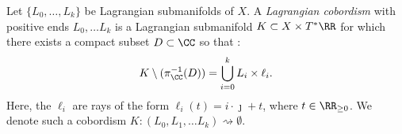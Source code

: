 
Let $\{L_0, \ldots, L_k\}$ be Lagrangian submanifolds of $X$. 
A \emph{Lagrangian cobordism} with positive ends $L_0, \ldots L_k$ is a Lagrangian submanifold $K\subset X\times T^*\RR$ for which there exists a compact subset $D\subset \CC$ so that : 
        \[K\setminus( \pi_\CC^{-1}(D))=\bigcup_{i=0}^k L_i\times \ell_i.\]
    Here, the $\ell_i$ are rays of the form $\ell_i(t)=i\cdot \jmath +t$, where $t\in \RR_{\geq 0}$.
We denote such a cobordism $K:(L_0,L_1, \ldots L_k)\rightsquigarrow \emptyset$. 
\label{def:lagrangianCobordism}

